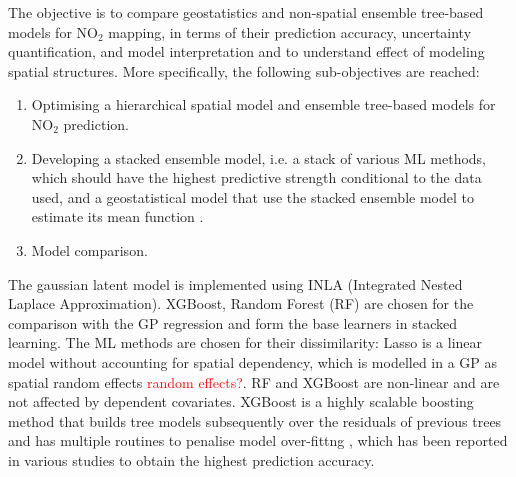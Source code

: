 \documentclass{article}
\begin{document}
The objective is to compare geostatistics and non-spatial ensemble tree-based models for NO$_2$ mapping, in terms of their prediction accuracy, uncertainty quantification, and model interpretation and to understand effect of modeling spatial structures. More specifically, the following sub-objectives are reached:

\begin{enumerate}
    \item Optimising a hierarchical spatial model and ensemble tree-based models for NO$_2$ prediction.
    
    \item Developing a stacked ensemble model, i.e. a stack of various ML methods, which should have the highest predictive strength conditional to the data used, and a geostatistical model that use the stacked ensemble model to estimate its mean function \citep{stackinla}.
    \item Model comparison. 
\end{enumerate}

 
 
The gaussian latent model is implemented using INLA (Integrated Nested Laplace Approximation). XGBoost, Random Forest (RF) are chosen for the comparison with the GP regression and form the base learners in stacked learning. The ML methods are chosen for their dissimilarity: Lasso is a linear model without accounting for spatial dependency, which is modelled in a GP as spatial random effects \textcolor{red}{random effects?}. RF and XGBoost are non-linear and are not affected by dependent covariates. XGBoost is a highly scalable boosting method that builds tree models subsequently over the residuals of previous trees and has multiple routines to penalise model over-fittng \citep{xgboost}, which has been reported in various studies to obtain the highest prediction accuracy\cite{luglobal}. 

 
 
\end{document}
